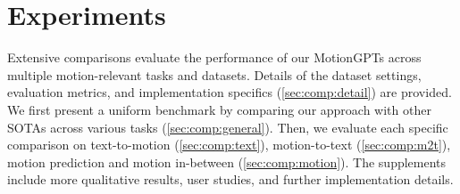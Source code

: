 
\section{Experiments}
\vspace{-10pt}
\label{experiments}
Extensive comparisons evaluate the performance of our MotionGPTs across multiple motion-relevant tasks and datasets. 
%
Details of the dataset settings, evaluation metrics, and implementation specifics (\cref{sec:comp:detail}) are provided.
%
We first present a uniform benchmark by comparing our approach with other SOTAs across various tasks (\cref{sec:comp:general}). Then, we evaluate each specific comparison on text-to-motion (\cref{sec:comp:text}), motion-to-text (\cref{sec:comp:m2t}), motion prediction and motion in-between (\cref{sec:comp:motion}).
%
The supplements include more qualitative results, user studies, and further implementation details.


